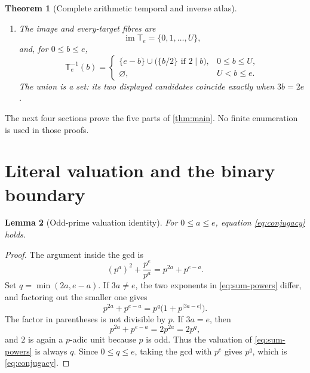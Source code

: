 \documentclass[10pt,a4paper]{amsart}
\newtheorem{theorem}{Theorem}[section]
\newtheorem{lemma}[theorem]{Lemma}
\theoremstyle{definition}
\theoremstyle{remark}
\newcommand{\T}{\mathsf T}
\newcommand{\im}{\operatorname{im}}
\begin{document}
\begin{theorem}[Complete arithmetic temporal and inverse atlas]
\begin{enumerate}[label=\textup{(\roman*)}]
\begin{equation}
 c_j=\left\lceil\frac{L}{2^{j-1}}\right\rceil
     -\left\lceil\frac{L}{2^j}\right\rceil.
\end{equation}
Then the complete temporal polynomial is
\begin{equation}\label{eq:temporal-polynomial}
 D_e(z):=\sum_{a=0}^{e}z^{\tau_e(a)}
 =R+z+(1+z)\sum_{j=1}^{m}c_jz^j.
\end{equation}
\item The image and every-target fibres are
\begin{equation}\label{eq:image}
 \im\T_e=\{0,1,\ldots,U\},
\end{equation}
and, for $0\leq b\leq e$,
\begin{equation}\label{eq:fibre}
 \T_e^{-1}(b)=
 \begin{cases}
 \{e-b\}\cup
   \bigl(\{b/2\}\text{ if }2\mid b\bigr),&0\leq b\leq U,\\
 \varnothing,&U<b\leq e.
 \end{cases}
\end{equation}
The union is a set: its two displayed candidates coincide exactly when
$3b=2e$.
\end{enumerate}
\end{theorem}

The next four sections prove the five parts of \cref{thm:main}.  No finite
enumeration is used in those proofs.

\section{Literal valuation and the binary boundary}

\begin{lemma}[Odd-prime valuation identity]\label{lem:valuation}
For $0\leq a\leq e$, equation \eqref{eq:conjugacy} holds.
\end{lemma}

\begin{proof}
The argument inside the gcd is
\begin{equation}\label{eq:sum-powers}
 (p^a)^2+\frac{p^e}{p^a}=p^{2a}+p^{e-a}.
\end{equation}
Set $q=\min(2a,e-a)$.  If $3a\neq e$, the two exponents in
\eqref{eq:sum-powers} differ, and factoring out the smaller one gives
\[
 p^{2a}+p^{e-a}=p^q\bigl(1+p^{|3a-e|}\bigr).
\]
The factor in parentheses is not divisible by $p$.  If $3a=e$, then
\[
 p^{2a}+p^{e-a}=2p^{2a}=2p^q,
\]
and $2$ is again a $p$-adic unit because $p$ is odd.  Thus the valuation of
\eqref{eq:sum-powers} is always $q$.  Since $0\leq q\leq e$, taking the gcd
with $p^e$ gives $p^q$, which is \eqref{eq:conjugacy}.
\end{proof}
\end{document}
